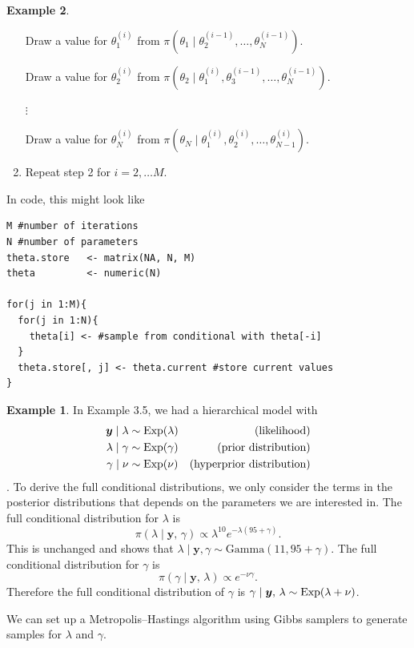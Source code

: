\documentclass[
]{book}
\theoremstyle{definition}
\theoremstyle{definition}
\newtheorem{example}{Example}[chapter]
\theoremstyle{definition}
\theoremstyle{definition}
\theoremstyle{remark}
\begin{document}
\begin{example}
\begin{enumerate}
  Draw a value for \(\theta_1^{(i)}\) from \(\pi(\theta_1 \mid \theta_2^{(i-1)}, \ldots, \theta_N^{(i-1)})\).

  Draw a value for \(\theta_2^{(i)}\) from \(\pi(\theta_2 \mid \theta_1^{(i)}, \theta_3^{(i-1)}, \ldots, \theta_N^{(i-1)})\).

  \(\vdots\)

  Draw a value for \(\theta_N^{(i)}\) from \(\pi(\theta_N \mid \theta_1^{(i)}, \theta_2^{(i)}, \ldots, \theta_{N-1}^{(i)})\).
\item
  Repeat step 2 for \(i = 2, \ldots M\).
\end{enumerate}

In code, this might look like

\begin{verbatim}
M #number of iterations
N #number of parameters
theta.store   <- matrix(NA, N, M)
theta         <- numeric(N)

for(j in 1:M){
  for(j in 1:N){
    theta[i] <- #sample from conditional with theta[-i]
  }
  theta.store[, j] <- theta.current #store current values
}
\end{verbatim}

\begin{example}
In Example 3.5, we had a hierarchical model with\\
\begin{align*}
\boldsymbol{y} \mid \lambda &\sim \hbox{Exp}(\lambda) & \textrm{(likelihood)} \\
\lambda \mid \gamma &\sim \hbox{Exp}(\gamma) & \textrm{(prior distribution)} \\
\gamma \mid \nu &\sim \hbox{Exp}(\nu) & \textrm{(hyperprior distribution)}  \\
\end{align*}.
To derive the full conditional distributions, we only consider the terms in the posterior distributions that depends on the parameters we are interested in. The full conditional distribution for \(\lambda\) is
\[
\pi(\lambda \mid \boldsymbol{y}, \,\gamma) \propto \lambda^{10}e^{-\lambda(95 + \gamma)}.
\]
This is unchanged and shows that \(\lambda \mid \boldsymbol{y}, \gamma \sim \textrm{Gamma}(11, 95 + \gamma)\). The full conditional distribution for \(\gamma\) is
\[
\pi(\gamma \mid \boldsymbol{y}, \,\lambda) \propto e^{-\nu\gamma}.
\]
Therefore the full conditional distribution of \(\gamma\) is \(\gamma \mid \boldsymbol{y}, \,\lambda \sim \hbox{Exp}(\lambda + \nu)\).

We can set up a Metropolis--Hastings algorithm using Gibbs samplers to generate samples for \(\lambda\) and \(\gamma\).


\end{example}
\end{example}
\end{document}
